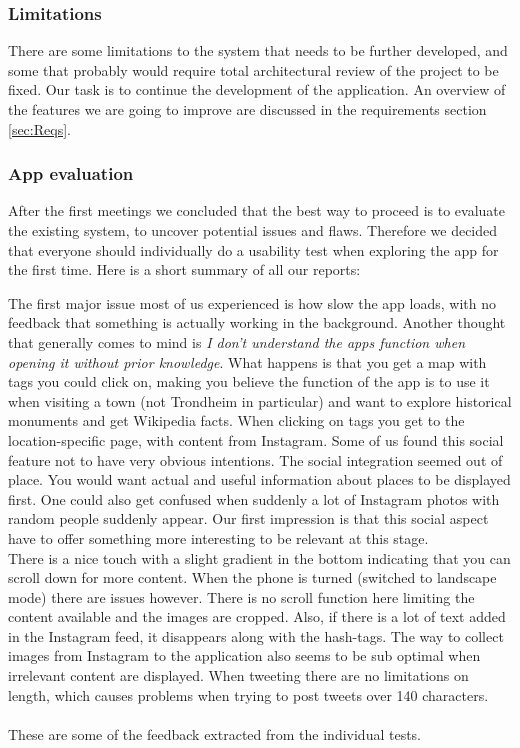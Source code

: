 		\subsubsection{Limitations}
There are some limitations to the system that needs to be further developed, and some that probably would require total architectural review of the project to be fixed. Our task is to continue the development of the application. An overview of the features we are going to improve are discussed in the requirements section \ref{sec:Reqs}. 

		\subsubsection{App evaluation}
		
After the first meetings we concluded that the best way to proceed is to evaluate the existing system, to uncover potential issues and flaws.
Therefore we decided that everyone should individually do a usability test when exploring the app for the first time. Here is a short summary of all our reports:

The first major issue most of us experienced is how slow the app loads, with no feedback that something is actually working in the background. Another thought that generally comes to mind is \emph{I don't understand the apps function when opening it without prior knowledge}. What happens is that you get a map with tags you could click on, making you believe the function of the app is to use it when visiting a town (not Trondheim in particular) and want to explore historical monuments and get Wikipedia facts. When clicking on tags you get to the location-specific page, with content from Instagram. Some of us found this social feature not to have very obvious intentions. The social integration seemed out of place. You would want actual and useful information about places to be displayed first. One could also get confused when suddenly a lot of Instagram photos with random people suddenly appear. Our first impression is that this social aspect have to offer something more interesting to be relevant at this stage. 
\\
There is a nice touch with a slight gradient in the bottom indicating that you can scroll down for more content. When the phone is turned (switched to landscape mode) there are issues however. There is no scroll function here limiting the content available and the images are cropped. Also, if there is a lot of text added in the Instagram feed, it disappears along with the hash-tags. The way to collect images from Instagram to the application also seems to be sub optimal when irrelevant content are displayed. When tweeting there are no limitations on length, which causes problems when trying to post tweets over 140 characters.\\
\\
These are some of the feedback extracted from the individual tests. 

